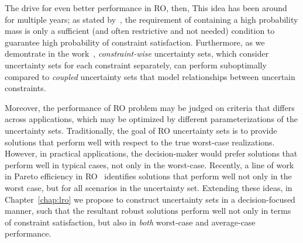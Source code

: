 The drive for even better performance in \gls{RO}, then, 
This idea has been around for multiple years; as stated by~\cite{ben-tal_robust_2009}, the requirement of containing a high probability mass is only a sufficient (and often restrictive and not needed) condition to guarantee high probability of constraint satisfaction.
Furthermore, as we demontrate in the work~\cite{coupling}, {\it constraint-wise} uncertainty sets, which consider uncertainty sets for each constraint separately, can perform suboptimally compared to {\it coupled} uncertainty sets that model relationships between uncertain constraints.  





Moreover, the performance of \gls{RO} problem may be judged on criteria that differs across applications, which may be optimized by different parameterizations of the uncertainty sets.
Traditionally, the goal of \gls{RO} uncertainty sets is to provide solutions that perform well with respect to the true worst-case realizations. However, in practical applications, the decision-maker would prefer solutions that perform well in typical cases, not only in the worst-case. Recently, a line of work in Pareto efficiency in \gls{RO}~\citep{pareto,pareto1,pareto3} identifies solutions that perform well not only in the worst case, but for all scenarios in the uncertainty set.
Extending these ideas, in Chapter~\ref{chap:lro} we propose to construct uncertainty sets in a decision-focused manner,
such that the resultant robust solutions perform well not only in terms of constraint satisfaction, but also in {\it both} worst-case and average-case performance.

